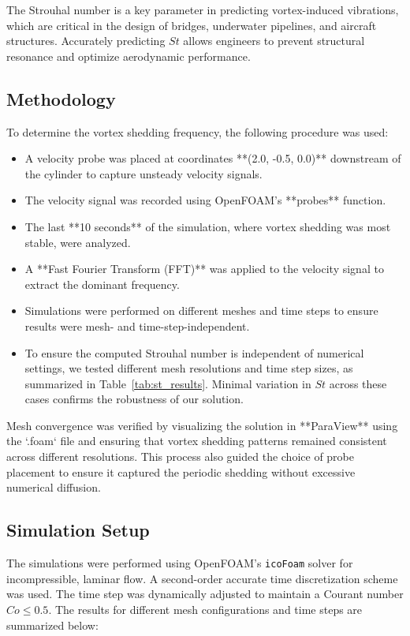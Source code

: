 \documentclass[11pt]{article}
\begin{document}
The Strouhal number is a key parameter in predicting vortex-induced vibrations, which are critical in the design of bridges, underwater pipelines, and aircraft structures. Accurately predicting \( St \) allows engineers to prevent structural resonance and optimize aerodynamic performance.

\subsection{Methodology}
To determine the vortex shedding frequency, the following procedure was used:
\begin{itemize}
    \item A velocity probe was placed at coordinates **(2.0, -0.5, 0.0)** downstream of the cylinder to capture unsteady velocity signals.
    \item The velocity signal was recorded using OpenFOAM’s **probes** function.
    \item The last **10 seconds** of the simulation, where vortex shedding was most stable, were analyzed.
    \item A **Fast Fourier Transform (FFT)** was applied to the velocity signal to extract the dominant frequency.
    \item Simulations were performed on different meshes and time steps to ensure results were mesh- and time-step-independent.
    \item To ensure the computed Strouhal number is independent of numerical settings,  
    we tested different mesh resolutions and time step sizes, as summarized in Table~\ref{tab:st_results}.  
    Minimal variation in \( St \) across these cases confirms the robustness of our solution.    
\end{itemize}

Mesh convergence was verified by visualizing the solution in **ParaView** using the `.foam` file and ensuring that vortex shedding patterns remained consistent across different resolutions. This process also guided the choice of probe placement to ensure it captured the periodic shedding without excessive numerical diffusion.

\subsection{Simulation Setup}
The simulations were performed using OpenFOAM’s \texttt{icoFoam} solver for incompressible, laminar flow. A second-order accurate time discretization scheme was used. The time step was dynamically adjusted to maintain a Courant number \( Co \leq 0.5 \). The results for different mesh configurations and time steps are summarized below:
\end{document}
